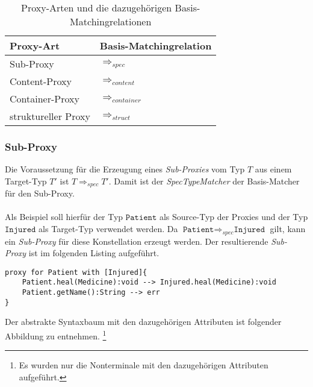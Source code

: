 \documentclass[a4paper,12pt]{article}
\begin{document}


\begin{table}[H]
\centering
\begin{tabular}{|p{5cm}|p{5cm}|}
\hline
\hline
\centering\textbf{Proxy-Art} & \textbf{Basis-Matchingrelation} \\
\hline
\hline
Sub-Proxy
&  
$\Rightarrow_{spec}$
\\
\hline
Content-Proxy
& 
$\Rightarrow_{content}$
\\
\hline
Container-Proxy
& 
$\Rightarrow_{container}$
\\
\hline
struktureller Proxy
&
$\Rightarrow_{struct}$ \\
\hline
\hline
\end{tabular}
\caption{Proxy-Arten und die dazugehörigen Basis-Matchingrelationen}
 \label{tab:baseMatcher}
\end{table}

\subsubsection{Sub-Proxy}

Die Voraussetzung für die Erzeugung eines \emph{Sub-Proxies} vom Typ $T$ aus einem Target-Typ $T'$ ist $T \Rightarrow_{spec} T'$. Damit ist der \emph{SpecTypeMatcher} der Basis-Matcher für den Sub-Proxy.\\\\
Als Beispiel soll hierfür der Typ $\texttt{Patient}$ als Source-Typ der Proxies und der Typ $\texttt{Injured}$ als Target-Typ verwendet werden. Da $\texttt{Patient} \Rightarrow_{spec} \texttt{Injured}$ gilt, kann ein \emph{Sub-Proxy} für diese Konstellation erzeugt werden. Der resultierende \emph{Sub-Proxy} ist im folgenden Listing aufgeführt.
\begin{lstlisting}[style = dsl]
proxy for Patient with [Injured]{
	Patient.heal(Medicine):void --> Injured.heal(Medicine):void
	Patient.getName():String --> err
}
\end{lstlisting}
Der abstrakte Syntaxbaum mit den dazugehörigen Attributen ist folgender Abbildung zu entnehmen. \footnote{Es wurden nur die Nonterminale mit den dazugehörigen Attributen aufgeführt.}
\begin{figure}

\end{figure}
\end{document}

